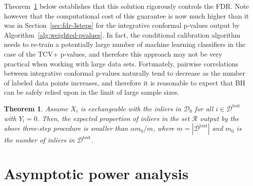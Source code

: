 \documentclass[11pt]{article}
\newtheorem{theorem}{Theorem}
\begin{document}
Theorem~\ref{theorem:fdr-cv++} below establishes that this solution rigorously controls the FDR.
Note however that the computational cost of this guarantee is now much higher than it was in Section~\ref{sec:fdr-3steps} for the integrative conformal p-values output by Algorithm~\ref{alg:weighted-pvalues}.
In fact, the conditional calibration algorithm needs to re-train a potentially large number of machine learning classifiers in the case of the TCV+ p-values, and therefore this approach may not be very practical when working with large data sets. Fortunately, pairwise correlations between integrative conformal p-values naturally tend to decrease as the number of labeled data points increases, and therefore it is reasonable to expect that BH can be safely relied upon in the limit of large sample sizes.

\begin{theorem} \label{theorem:fdr-cv++}
Assume $X_{i}$ is exchangeable with the inliers in $\mathcal{D}_0$ for all $i \in \mathcal{D}^{\mathrm{test}}$ with $Y_i=0$.
Then, the expected proportion of inliers in the set $\mathcal{R}$ output by the above three-step procedure is smaller than $\alpha m_0/m$, where $m = |\mathcal{D}^{\mathrm{test}}|$ and $m_0$ is the number of inliers in $\mathcal{D}^{\mathrm{test}}$.
\end{theorem}



\section{Asymptotic power analysis} \label{sec:asymptotic}
\end{document}
